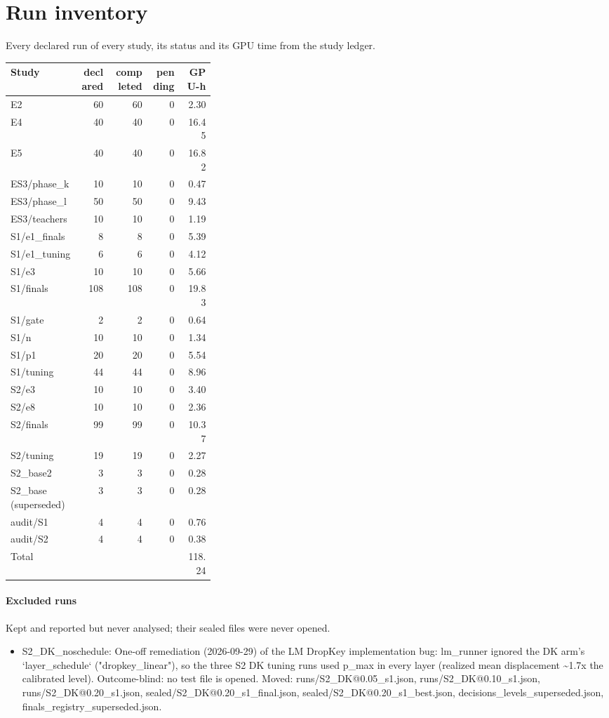 \documentclass[11pt]{article}
\begin{document}
\section{Run inventory}
Every declared run of every study, its status and its GPU time from the study ledger.
\begin{longtable}{p{0.34\linewidth}rrrr}\toprule Study & declared & completed & pending & GPU-h\\\midrule\endhead
E2 & 60 & 60 & 0 & 2.30\\
E4 & 40 & 40 & 0 & 16.45\\
E5 & 40 & 40 & 0 & 16.82\\
ES3/phase\_k & 10 & 10 & 0 & 0.47\\
ES3/phase\_l & 50 & 50 & 0 & 9.43\\
ES3/teachers & 10 & 10 & 0 & 1.19\\
S1/e1\_finals & 8 & 8 & 0 & 5.39\\
S1/e1\_tuning & 6 & 6 & 0 & 4.12\\
S1/e3 & 10 & 10 & 0 & 5.66\\
S1/finals & 108 & 108 & 0 & 19.83\\
S1/gate & 2 & 2 & 0 & 0.64\\
S1/n & 10 & 10 & 0 & 1.34\\
S1/p1 & 20 & 20 & 0 & 5.54\\
S1/tuning & 44 & 44 & 0 & 8.96\\
S2/e3 & 10 & 10 & 0 & 3.40\\
S2/e8 & 10 & 10 & 0 & 2.36\\
S2/finals & 99 & 99 & 0 & 10.37\\
S2/tuning & 19 & 19 & 0 & 2.27\\
S2\_base2 & 3 & 3 & 0 & 0.28\\
S2\_base (superseded) & 3 & 3 & 0 & 0.28\\
audit/S1 & 4 & 4 & 0 & 0.76\\
audit/S2 & 4 & 4 & 0 & 0.38\\
\midrule Total & & & & 118.24\\\bottomrule\end{longtable}
\paragraph{Excluded runs} Kept and reported but never analysed; their sealed files were never opened.\begin{itemize}
\item S2\_DK\_noschedule: One-off remediation (2026-09-29) of the LM DropKey implementation bug: lm\_runner ignored the DK arm's `layer\_schedule` ("dropkey\_linear"), so the three S2 DK tuning runs used p\_max in every layer (realized mean displacement \textasciitilde{}1.7x the calibrated level). Outcome-blind: no test file is opened. Moved: runs/S2\_DK@0.05\_s1.json, runs/S2\_DK@0.10\_s1.json, runs/S2\_DK@0.20\_s1.json, sealed/S2\_DK@0.20\_s1\_final.json, sealed/S2\_DK@0.20\_s1\_best.json, decisions\_levels\_superseded.json, finals\_registry\_superseded.json.
\end{itemize}
\end{document}

